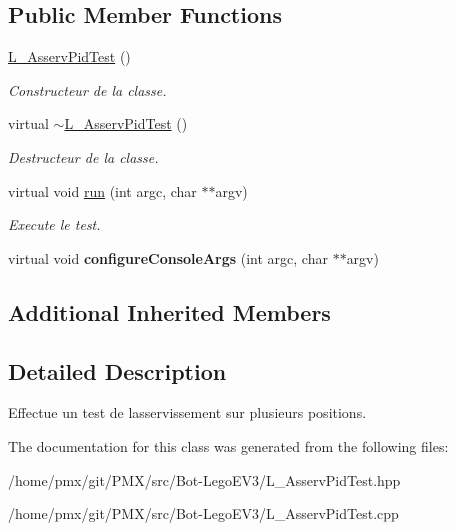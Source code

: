 \subsection*{Public Member Functions}
\begin{DoxyCompactItemize}
\item 
\mbox{\label{classL__AsservPidTest_a31ffb924067c86aa6456027f23eb0bef}} 
\hyperlink{classL__AsservPidTest_a31ffb924067c86aa6456027f23eb0bef}{L\+\_\+\+Asserv\+Pid\+Test} ()
\begin{DoxyCompactList}\small\item\em Constructeur de la classe. \end{DoxyCompactList}\item 
\mbox{\label{classL__AsservPidTest_a3a26b6bb7f5d65a839d54ecaf7411282}} 
virtual \hyperlink{classL__AsservPidTest_a3a26b6bb7f5d65a839d54ecaf7411282}{$\sim$\+L\+\_\+\+Asserv\+Pid\+Test} ()
\begin{DoxyCompactList}\small\item\em Destructeur de la classe. \end{DoxyCompactList}\item 
\mbox{\label{classL__AsservPidTest_a7161b32c707082e95469394e12c2a3f8}} 
virtual void \hyperlink{classL__AsservPidTest_a7161b32c707082e95469394e12c2a3f8}{run} (int argc, char $\ast$$\ast$argv)
\begin{DoxyCompactList}\small\item\em Execute le test. \end{DoxyCompactList}\item 
\mbox{\label{classL__AsservPidTest_aa83e2e46e64017f0c97a367483eb655e}} 
virtual void {\bfseries configure\+Console\+Args} (int argc, char $\ast$$\ast$argv)
\end{DoxyCompactItemize}
\subsection*{Additional Inherited Members}


\subsection{Detailed Description}
Effectue un test de l\textquotesingle{}asservissement sur plusieurs positions. 

The documentation for this class was generated from the following files\+:\begin{DoxyCompactItemize}
\item 
/home/pmx/git/\+P\+M\+X/src/\+Bot-\/\+Lego\+E\+V3/L\+\_\+\+Asserv\+Pid\+Test.\+hpp\item 
/home/pmx/git/\+P\+M\+X/src/\+Bot-\/\+Lego\+E\+V3/L\+\_\+\+Asserv\+Pid\+Test.\+cpp\end{DoxyCompactItemize}

